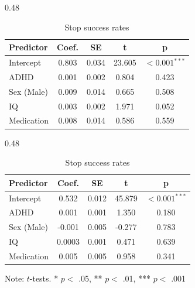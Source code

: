 \begin{table}[H]
\begin{threeparttable}
\begin{minipage}{\linewidth}
    \begin{subtable}[t]{0.48\linewidth}
    \centering
    \caption{Go success rates}
    \label{tab:lm_all_c}
    \begin{tabular}{lcccc}
    \toprule
    \textbf{Predictor} & \textbf{Coef.} & \textbf{SE} & \textbf{t} & \textbf{p} \\
    \midrule
    Intercept & 0.803 & 0.034 & 23.605 & $<0.001$$^{***}$ \\
    ADHD & 0.001 & 0.002 & 0.804 & 0.423 \\
    Sex (Male) & 0.009 & 0.014 & 0.665 & 0.508 \\
    IQ & 0.003 & 0.002 & 1.971 & 0.052 \\
    Medication & 0.008 & 0.014 & 0.586 & 0.559 \\
    \bottomrule
    \end{tabular}
    \end{subtable}
\hfill
    \begin{subtable}[t]{0.48\linewidth}
    \centering
    \caption{Stop success rates}
    \label{tab:lm_all_d}
    \begin{tabular}{lcccc}
    \toprule
    \textbf{Predictor} & \textbf{Coef.} & \textbf{SE} & \textbf{t} & \textbf{p} \\
    \midrule
    Intercept & 0.532 & 0.012 & 45.879 & $<0.001$$^{***}$ \\
    ADHD & 0.001 & 0.001 & 1.350 & 0.180 \\
    Sex (Male) & -0.001 & 0.005 & -0.277 & 0.783 \\
    IQ & 0.0003 & 0.001 & 0.471 & 0.639 \\
    Medication & 0.005 & 0.005 & 0.958 & 0.341 \\
    \bottomrule
    \end{tabular}
    \end{subtable}
\end{minipage}

\vspace{1mm}
\begin{minipage}{\textwidth} %
    \footnotesize \noindent Note: $t$-tests. * $p <$ .05, ** $p <$ .01, *** $p <$ .001
\end{minipage}
\end{threeparttable}
\end{table}